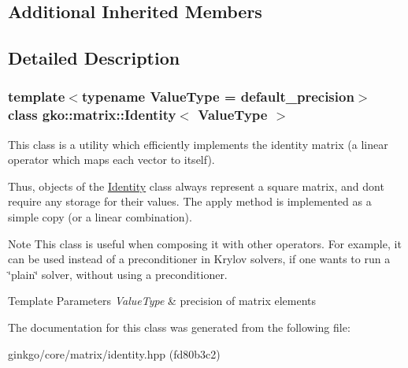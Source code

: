 \subsection*{Additional Inherited Members}


\subsection{Detailed Description}
\subsubsection*{template$<$typename Value\+Type = default\+\_\+precision$>$\newline
class gko\+::matrix\+::\+Identity$<$ Value\+Type $>$}

This class is a utility which efficiently implements the identity matrix (a linear operator which maps each vector to itself). 

Thus, objects of the \hyperlink{classgko_1_1matrix_1_1Identity}{Identity} class always represent a square matrix, and don\textquotesingle{}t require any storage for their values. The apply method is implemented as a simple copy (or a linear combination).

\begin{DoxyNote}{Note}
This class is useful when composing it with other operators. For example, it can be used instead of a preconditioner in Krylov solvers, if one wants to run a \char`\"{}plain\char`\"{} solver, without using a preconditioner.
\end{DoxyNote}

\begin{DoxyTemplParams}{Template Parameters}
{\em Value\+Type} & precision of matrix elements \\
\hline
\end{DoxyTemplParams}


The documentation for this class was generated from the following file\+:\begin{DoxyCompactItemize}
\item 
ginkgo/core/matrix/identity.\+hpp (fd80b3c2)\end{DoxyCompactItemize}
